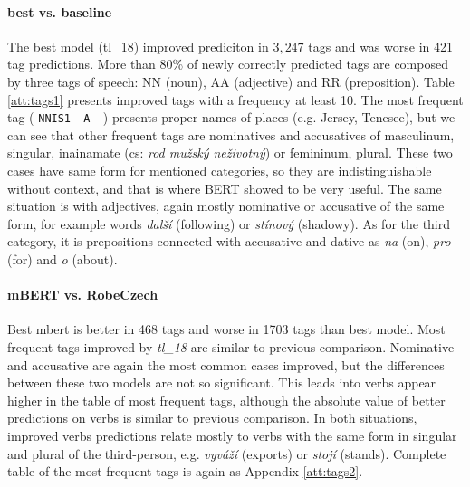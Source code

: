 \paragraph{best vs. baseline}
The best model (tl\_18) improved prediciton in $3,247$ tags and was worse in 421 tag predictions. More than 80\% of newly correctly predicted tags are composed by three tags of speech: NN (noun), AA (adjective) and RR (preposition). Table \ref{att:tags1} presents improved tags with a frequency at least 10. The most frequent tag ( \texttt{NNIS1-----A----}) presents proper names of places (e.g. Jersey, Tenesee), but we can see that other frequent tags are nominatives and accusatives of masculinum, singular,  inainamate (cs: \textit{rod mužský neživotný}) or femininum, plural. These two cases have same form for mentioned categories, so they are indistinguishable without context, and that is where BERT showed to be very useful. The same situation is with adjectives, again mostly nominative or accusative of the same form, for example words \textit{další} (following) or \textit{stínový} (shadowy). As for the third category, it is prepositions connected with accusative and dative as \textit{na} (on), \textit{pro} (for) and \textit{o} (about).


\paragraph{mBERT vs. RobeCzech}
Best mbert is better in 468 tags and worse in 1703 tags than best model. Most frequent tags improved by \textit{tl\_18} are similar to previous comparison. Nominative and accusative are again the most common cases improved, but the differences between these two models are not so significant. This leads into verbs appear higher in the table of most frequent tags, although the absolute value of better predictions on verbs is similar to previous comparison. In both situations, improved verbs predictions relate mostly to verbs with the same form in singular and plural of the third-person, e.g. \textit{vyváží} (exports) or \textit{stojí} (stands). Complete table of the most frequent tags is again as Appendix \ref{att:tags2}.

